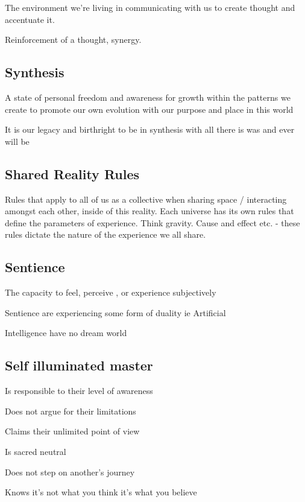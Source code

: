 The environment we're living in communicating with us to create thought
and accentuate it.

Reinforcement of a thought, synergy.

\subsection{Synthesis}\label{synthesis}

A state of personal freedom and awareness for growth within the patterns
we create to promote our own evolution with our purpose and place in
this world

It is our legacy and birthright to be in synthesis with all there is was
and ever will be

\subsection{Shared Reality Rules}\label{shared-reality-rules}

Rules that apply to all of us as a collective when sharing space /
interacting amongst each other, inside of this reality. Each universe
has its own rules that define the parameters of experience. Think
gravity. Cause and effect etc. - these rules dictate the nature of the
experience we all share.

\subsection{Sentience}\label{sentience}

The capacity to feel, perceive , or experience subjectively

Sentience are experiencing some form of duality ie Artificial

Intelligence have no dream world

\subsection{Self illuminated master}\label{self-illuminated-master}

Is responsible to their level of awareness

Does not argue for their limitations

Claims their unlimited point of view

Is sacred neutral

Does not step on another's journey

Knows it's not what you think it's what you believe

